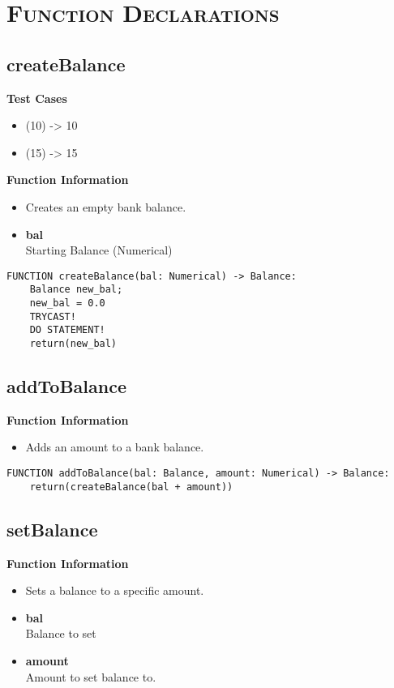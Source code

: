 
\section{\textsc{Function Declarations}}

\subsection{createBalance}
\textbf{Test Cases}
\begin{itemize}
	\setlength{\itemsep}{5pt}
	\setlength{\parskip}{0pt}
	\setlength{\parsep}{0pt}
	\item (10) -> 10
	\item (15) -> 15
\end{itemize}

\textbf{Function Information}
\begin{itemize}
	\setlength{\itemsep}{5pt}
	\setlength{\parskip}{0pt}
	\setlength{\parsep}{0pt}
	\item Creates an empty bank balance.
	\item \textbf{bal} \\ Starting Balance (Numerical)
\end{itemize}

\begin{verbatim}
FUNCTION createBalance(bal: Numerical) -> Balance:
	Balance new_bal;
	new_bal = 0.0
	TRYCAST!
	DO STATEMENT!
	return(new_bal)
\end{verbatim}


\subsection{addToBalance}
\textbf{Function Information}
\begin{itemize}
	\setlength{\itemsep}{5pt}
	\setlength{\parskip}{0pt}
	\setlength{\parsep}{0pt}
	\item Adds an amount to a bank balance.
\end{itemize}

\begin{verbatim}
FUNCTION addToBalance(bal: Balance, amount: Numerical) -> Balance:
	return(createBalance(bal + amount))
\end{verbatim}


\subsection{setBalance}
\textbf{Function Information}
\begin{itemize}
	\setlength{\itemsep}{5pt}
	\setlength{\parskip}{0pt}
	\setlength{\parsep}{0pt}
	\item Sets a balance to a specific amount.
	\item \textbf{bal} \\ Balance to set
	\item \textbf{amount} \\ Amount to set balance to.
\end{itemize}

